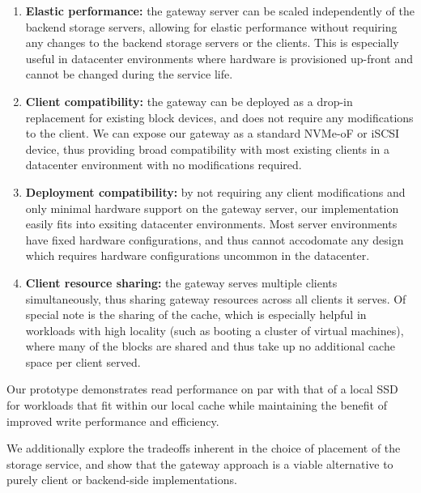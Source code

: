 \begin{enumerate}

    \item \textbf{Elastic performance:} the gateway server can be scaled
          independently of the backend storage servers, allowing for elastic
          performance without requiring any changes to the backend storage servers or
          the clients.  This is especially useful in datacenter environments where
          hardware is provisioned up-front and cannot be changed during the service
          life.

    \item \textbf{Client compatibility:} the gateway can be deployed as a drop-in
          replacement for existing block devices, and does not require any modifications
          to the client. We can expose our gateway as a standard NVMe-oF or iSCSI
          device, thus providing broad compatibility with most existing clients in a
          datacenter environment with no modifications required.

    \item \textbf{Deployment compatibility:} by not requiring any client
          modifications and only minimal hardware support on the gateway server, our
          implementation easily fits into exsiting datacenter environments. Most
          server environments have fixed hardware configurations, and thus cannot
          accodomate any design which requires hardware configurations uncommon
          in the datacenter.

    \item \textbf{Client resource sharing:} the gateway serves multiple clients
          simultaneously, thus sharing gateway resources across all clients it serves.
          Of special note is the sharing of the cache, which is especially helpful in
          workloads with high locality (such as booting a cluster of virtual
          machines), where many of the blocks are shared and thus take up no
          additional cache space per client served.

\end{enumerate}

Our prototype demonstrates read performance on par with that of a local SSD for
workloads that fit within our local cache while maintaining the benefit of
improved write performance and efficiency.

We additionally explore the tradeoffs inherent in the choice of placement of
the storage service, and show that the gateway approach is a viable alternative
to purely client or backend-side implementations.

